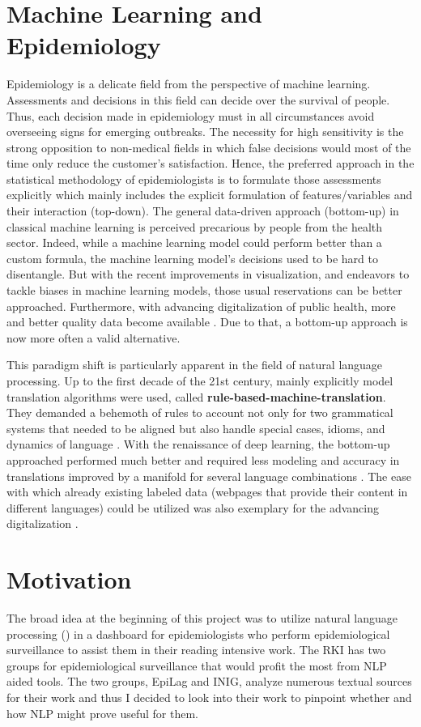 \section{Machine Learning and Epidemiology}
Epidemiology is a delicate field from the perspective of machine learning.
Assessments and decisions in this field can decide over the survival of people.
Thus, each decision made in epidemiology must in all circumstances avoid overseeing signs for emerging outbreaks.
The necessity for high sensitivity is the strong opposition to non-medical fields in which false decisions would most of the time only reduce the customer's satisfaction.
Hence, the preferred approach in the statistical methodology of epidemiologists is to formulate those assessments explicitly which mainly includes the explicit formulation of features/variables and their interaction (top-down).
The general data-driven approach (bottom-up) in classical machine learning is perceived precarious by people from the health sector.
Indeed, while a machine learning model could perform better than a custom formula, the machine learning model's decisions used to be hard to disentangle.
But with the recent improvements in visualization, and endeavors to tackle biases in machine learning models, those usual reservations can be better approached.
Furthermore, with advancing digitalization of public health, more and better quality data become available \citep{DEMIS}.
Due to that, a bottom-up approach is now more often a valid alternative.

This paradigm shift is particularly apparent in the field of natural language processing.
Up to the first decade of the 21st century, mainly explicitly model translation algorithms were used, called \textbf{rule-based-machine-translation}.
They demanded a behemoth of rules to account not only for two grammatical systems that needed to be aligned but also handle special cases, idioms, and dynamics of language \citep{Bar-Hillel1953, Bar-Hillel1960}.
With the renaissance of deep learning, the bottom-up approached performed much better and required less modeling and accuracy in translations improved by a manifold for several language combinations \citep{Bengio2003}.
The ease with which already existing labeled data (webpages that provide their content in different languages) could be utilized was also exemplary for the advancing digitalization \citep{Macklovitch00}.



\section{Motivation}
The broad idea at the beginning of this project was to utilize natural language
processing () in a dashboard for epidemiologists who perform epidemiological
surveillance to assist them in their reading intensive work.
The RKI has two groups for epidemiological surveillance that would profit the most from NLP aided tools. The two groups, EpiLag and INIG, analyze numerous textual sources for their work and thus I decided to look into their work to pinpoint whether and how NLP might prove useful for them.

